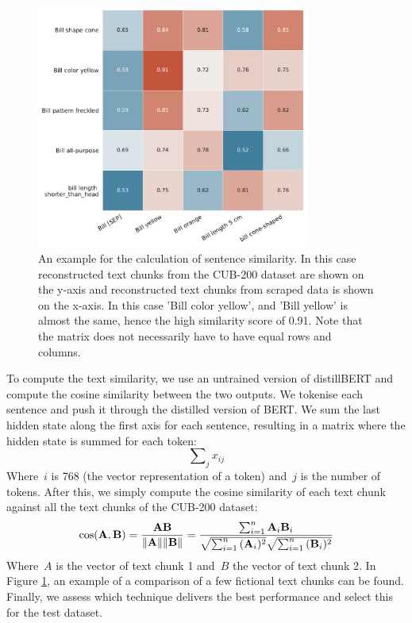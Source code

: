 \documentclass[a4paper, 12pt, oneside]{book} %
\begin{document}
\begin{figure} [htbp]
    \centering
    \hspace{-3cm}
    \includegraphics[width=0.8\textwidth]{similarity_matrix.pdf}
    \caption[Example of sentence similarity]{An example for the calculation of sentence similarity. 
    In this case reconstructed text chunks from the CUB-200 dataset are shown on the y-axis and reconstructed text chunks from scraped data is shown on the x-axis. In this case 'Bill color yellow', and 'Bill yellow' is almost the same, hence the high similarity score of 0.91. Note that the matrix does not necessarily have to have equal rows and columns.}
    \label{fig:similarity_matrix}
\end{figure}



To compute the text similarity, we use an untrained version of distillBERT and compute the cosine similarity between the two outputs.
We tokenise each sentence and push it through the distilled version of BERT.
We sum the last hidden state along the first axis for each sentence, resulting in a matrix where the hidden state is summed for each token:
\begin{equation}
     \sum\nolimits_{j}^{} x_{ij} 
\end{equation}
Where~$i$ is 768 (the vector representation of a token) and~$j$ is the number of tokens. 
After this, we simply compute the cosine similarity of each text chunk against all the text chunks of the CUB-200 dataset:
\begin{equation}
\cos ({\bf A},{\bf B})= {{\bf A} {\bf B} \over \|{\bf A}\| \|{\bf B}\|} = \frac{ \sum_{i=1}^{n}{{\bf A}_i{\bf B}_i} }{ \sqrt{\sum_{i=1}^{n}{({\bf A}_i)^2}} \sqrt{\sum_{i=1}^{n}{({\bf B}_i)^2}} }
\end{equation} \label{eq:cosine_sim}
Where~$A$ is the vector of text chunk 1 and~$B$ the vector of text chunk 2. 
In Figure \ref{fig:similarity_matrix}, an example of a comparison of a few fictional text chunks can be found. 
Finally, we assess which technique delivers the best performance and select this for the test dataset.
\end{document}

